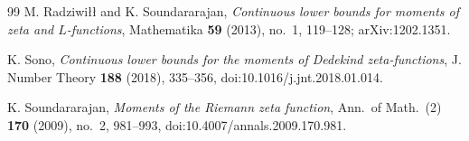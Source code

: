 \documentclass[11pt]{amsart}
\numberwithin{equation}{section}
\theoremstyle{plain}
\begin{document}
\begin{thebibliography}{99}
M. Radziwi\l\l{} and K. Soundararajan,
\emph{Continuous lower bounds for moments of zeta and $L$-functions},
Mathematika \textbf{59} (2013), no.~1, 119--128;
arXiv:1202.1351.

K. Sono,
\emph{Continuous lower bounds for the moments of Dedekind zeta-functions},
J. Number Theory \textbf{188} (2018), 335--356,
doi:10.1016/j.jnt.2018.01.014.

K. Soundararajan,
\emph{Moments of the Riemann zeta function},
Ann.\ of Math.\ (2) \textbf{170} (2009), no.~2, 981--993,
doi:10.4007/annals.2009.170.981.

\end{thebibliography}

\enlargethispage{4\baselineskip}
\end{document}
